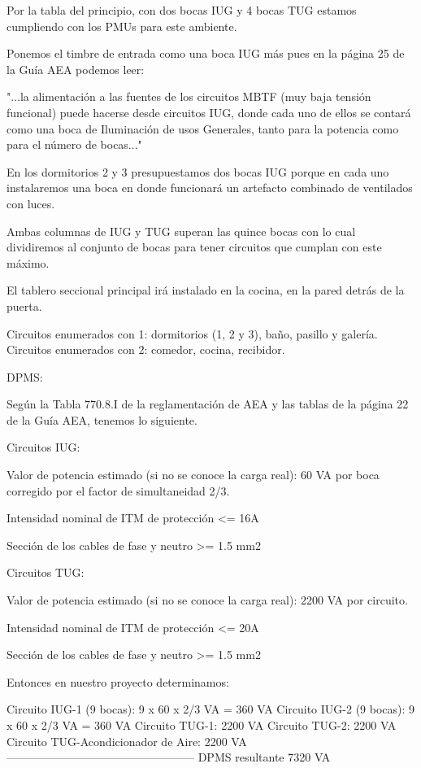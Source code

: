 Por la tabla del principio, con dos bocas IUG y 4 bocas TUG estamos cumpliendo con los PMUs para este ambiente.

Ponemos el timbre de entrada como una boca IUG más pues en la página 25 de la Guía AEA
podemos leer:

		"...la alimentación a las fuentes de los circuitos MBTF (muy baja tensión
		funcional) puede hacerse desde circuitos IUG, donde cada uno de ellos se 
		contará como una boca de Iluminación de usos Generales, tanto para la 
		potencia como para el número de bocas..."


En los dormitorios 2 y 3 presupuestamos dos bocas IUG porque en cada uno
instalaremos una boca en donde funcionará un artefacto combinado de 
ventilados con luces.


Ambas columnas de IUG y TUG superan las quince bocas con lo cual
dividiremos al conjunto de bocas para tener circuitos que cumplan
con este máximo.


El tablero seccional principal irá instalado en la cocina, en la pared
detrás de la puerta.

Circuitos enumerados con 1: dormitorios (1, 2 y 3), baño, pasillo y galería.
Circuitos enumerados con 2: comedor, cocina, recibidor.

DPMS:

Según la Tabla 770.8.I de la reglamentación de AEA y las tablas de la página
22 de la Guía AEA, tenemos lo siguiente.

Circuitos IUG:

Valor de potencia estimado (si no se conoce la carga real): 60 VA por boca
corregido por el factor de simultaneidad 2/3.

Intensidad nominal de ITM de protección <= 16A

Sección de los cables de fase y neutro >= 1.5 mm2

Circuitos TUG:

Valor de potencia estimado (si no se conoce la carga real): 2200 VA por circuito.

Intensidad nominal de ITM de protección <= 20A

Sección de los cables de fase y neutro >= 1.5 mm2

Entonces en nuestro proyecto determinamos:

Circuito IUG-1 (9 bocas): 9 x 60 x 2/3 VA = 360 VA 
Circuito IUG-2 (9 bocas): 9 x 60 x 2/3 VA = 360 VA
Circuito TUG-1:                            2200 VA
Circuito TUG-2:                            2200 VA
Circuito TUG-Acondicionador de Aire:       2200 VA  
--------------------------------------------------
DPMS resultante                            7320 VA

